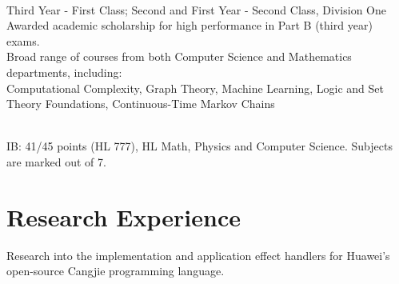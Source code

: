 \documentclass[]{deedy-resume-openfont}
\begin{document}
\hfill {}\\
Third Year - First Class; Second and First Year - Second Class, Division One\\
Awarded academic scholarship for high performance in Part B (third year) exams. \\
Broad range of courses from both Computer Science and Mathematics departments, including:\\ Computational Complexity, Graph Theory, Machine Learning, Logic and Set Theory Foundations, Continuous-Time Markov Chains
\sectionsep
  
\hfill {}\\
IB: 41/45 points (HL 777), HL Math, Physics and Computer Science. Subjects are marked out of 7.\\
\sectionsep

%
%
\renewcommand\refname{PUBLICATIONS}
\nocite{*}


\sectionsep

%
%
\section{Research Experience}
\hfill {}
\begin{tightemize}
    \item Research into the implementation and application effect handlers for Huawei's open-source Cangjie programming language.
\end{tightemize}
\sectionsep
\end{document}
